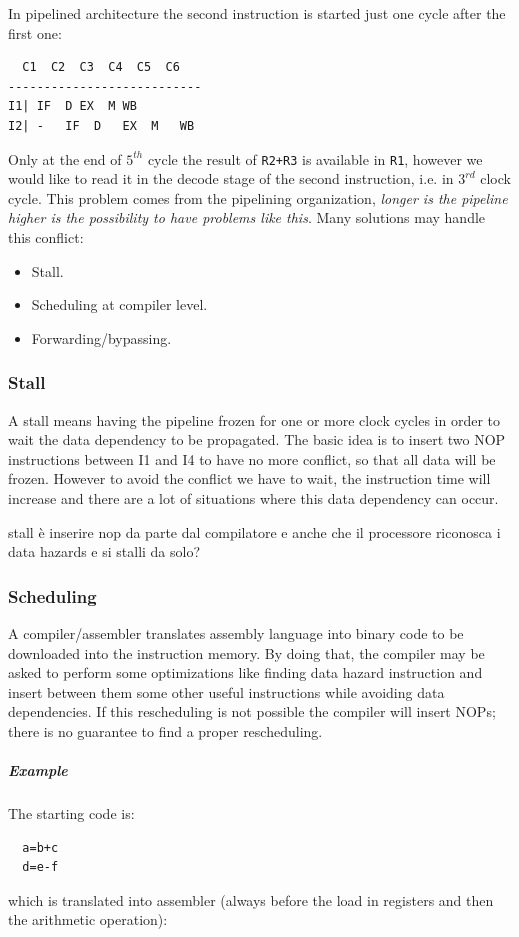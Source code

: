 In pipelined architecture the second instruction is started just one cycle after the first one:
\begin{verbatim}
  C1  C2  C3  C4  C5  C6
---------------------------
I1| IF  D EX  M WB
I2| -   IF  D   EX  M   WB
\end{verbatim}

Only at the end of $5^{th}$ cycle the result of \verb|R2+R3| is available in \verb|R1|, however we would like to read it in the decode stage of the second instruction, i.e. in $3^{rd}$ clock cycle. This problem comes from the pipelining organization, \textit{longer is the pipeline higher is the possibility to have problems like this}. Many solutions may handle this conflict:
\begin{itemize}
  \item Stall.
  \item Scheduling at compiler level.
  \item Forwarding/bypassing.
\end{itemize}

\subsubsection{Stall}
  A stall means having the pipeline frozen for one or more clock cycles in order to wait the data dependency to be propagated. The basic idea is to insert two NOP instructions between I1 and I4 to have no more conflict, so that all data will be frozen. However to avoid the conflict we have to wait, the instruction time will increase and there are a lot of situations where this data dependency can occur.

  stall è inserire nop da parte dal compilatore e anche che il processore riconosca i data hazards e si stalli da solo?

\subsubsection{Scheduling}
   A compiler/assembler translates assembly language into binary code to be downloaded into the instruction memory. By doing that, the compiler may be asked to perform some optimizations like finding data hazard instruction and insert between them some other useful instructions while avoiding data dependencies. If this rescheduling is not possible the compiler will insert NOPs; there is no guarantee to find a proper rescheduling.\\

  \subparagraph{Example}
  The starting code is:
  \begin{verbatim}
  a=b+c
  d=e-f
  \end{verbatim}
  which is translated into assembler (always before the load in registers and then the arithmetic operation):

